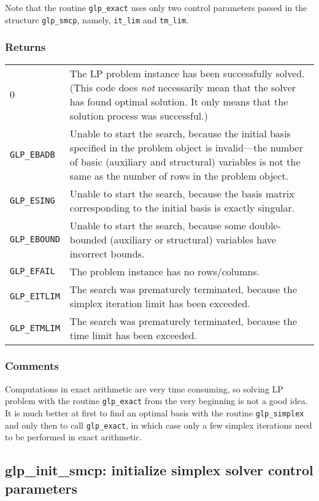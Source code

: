 Note that the routine \verb|glp_exact| uses only two control parameters
passed in the structure \verb|glp_smcp|, namely, \verb|it_lim| and
\verb|tm_lim|.

\subsubsection*{Returns}

\def\arraystretch{1}

\begin{tabular}{@{}p{25mm}p{97.3mm}@{}}
0 & The LP problem instance has been successfully solved. (This code
does {\it not} necessarily mean that the solver has found optimal
solution. It only means that the solution process was successful.) \\
\verb|GLP_EBADB| & Unable to start the search, because the initial basis
specified in the problem object is invalid---the number of basic
(auxiliary and structural) variables is not the same as the number of
rows in the problem object.\\
\verb|GLP_ESING| & Unable to start the search, because the basis matrix
corresponding to the initial basis is exactly singular.\\
\verb|GLP_EBOUND| & Unable to start the search, because some
double-bounded (auxiliary or structural) variables have incorrect
bounds.\\
\verb|GLP_EFAIL| & The problem instance has no rows/columns.\\
\verb|GLP_EITLIM| & The search was prematurely terminated, because the
simplex iteration limit has been exceeded.\\
\verb|GLP_ETMLIM| & The search was prematurely terminated, because the
time limit has been exceeded.\\
\end{tabular}

\subsubsection*{Comments}

Computations in exact arithmetic are very time consuming, so solving
LP problem with the routine \verb|glp_exact| from the very beginning is
not a good idea. It is much better at first to find an optimal basis
with the routine \verb|glp_simplex| and only then to call
\verb|glp_exact|, in which case only a few simplex iterations need to
be performed in exact arithmetic.

\subsection{glp\_init\_smcp: initialize simplex solver control
parameters}

